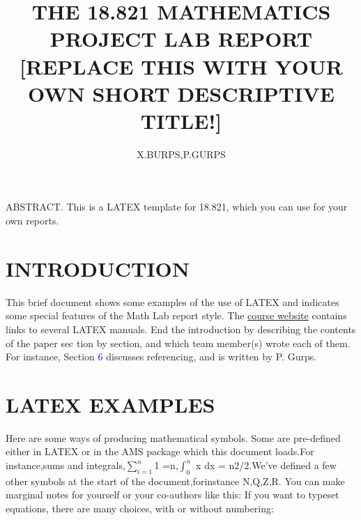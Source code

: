\documentclass{article}
\title{\textbf{THE 18.821 MATHEMATICS PROJECT LAB REPORT
	[REPLACE THIS WITH YOUR OWN SHORT
	DESCRIPTIVE TITLE!]}}
\author{X.BURPS,P.GURPS}
\begin{document}
	\maketitle
		ABSTRACT. This is a LATEX template for 18.821, which you can\newline
		use for your own reports.
		\centering
	  \section{INTRODUCTION}
	  \large{This brief document shows some examples of the use of LATEX and
	  indicates some special features of the Math Lab report style. The
	  \textcolor{blue}{\url{course website}} contains links to several LATEX manuals.\newline
	 \hspace{0.5cm}End the introduction by describing the contents of the paper sec­ 
	  tion by section, and which team member(s) wrote each of them. For
	  instance, Section \textcolor{blue}{6} discusses referencing, and is written by P. Gurps.}
 \section{LATEX EXAMPLES}
 \large{Here are some ways of producing mathematical symbols. Some are \newline
 pre-defined either in LATEX or in the AMS package which this document \newline loads.For instance,sums and integrals,$\sum_{i=1}^{n}$1 =n,$\int_{0}^{n}$ x dx = n2/2.\newline We've defined a few other symbols at the start of the document,for\newline instance N,Q,Z,R. You can make marginal notes for yourself or your co-authors like this:\newline
 If you want to typeset equations, there are many choices, with or without numbering:}\newline
 
\end{document}
